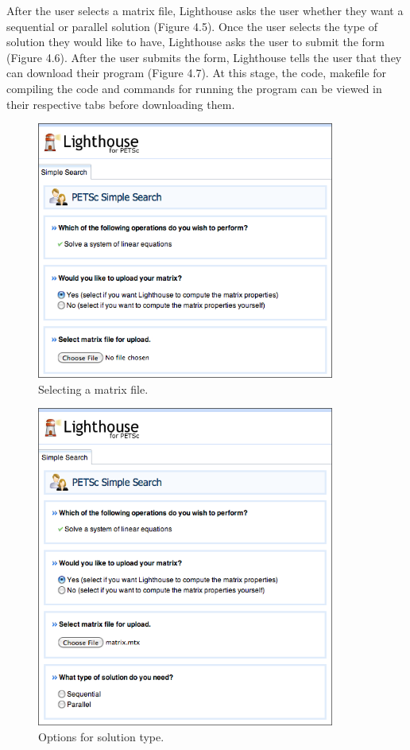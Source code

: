 \noindent After the user selects a matrix file, Lighthouse asks the user whether they want a sequential or parallel solution (Figure 4.5). Once the user selects the type of solution they would like to have, Lighthouse asks the user to submit the form (Figure 4.6). After the user submits the form, Lighthouse tells the user that they can download their program (Figure 4.7). At this stage, the code, makefile for compiling the code and commands for running the program can be viewed in their respective tabs before downloading them.

\begin{figure}[H]\label{petscui3}
  \centering
  \includegraphics[width=3.85in]{figs/petsc_3}
  \caption[Selecting a matrix file.]
   {Selecting a matrix file.}
\end{figure}

\begin{figure}[H]\label{petscui4}
  \centering
  \includegraphics[width=3.85in]{figs/petsc_4}
  \caption[Options for solution type.]
   {Options for solution type.}
\end{figure}

